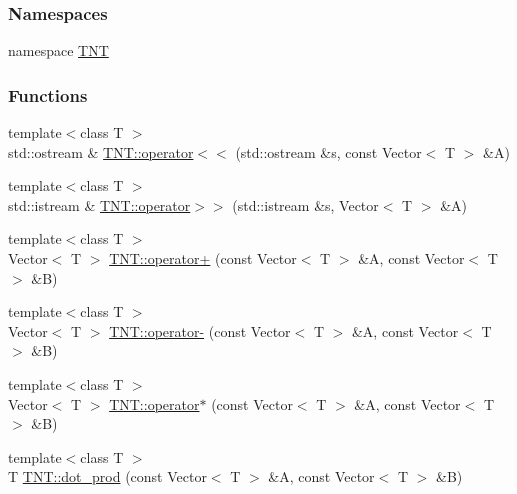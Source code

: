 \subsubsection*{Namespaces}
\begin{DoxyCompactItemize}
\item 
namespace \hyperlink{namespace_t_n_t}{TNT}
\end{DoxyCompactItemize}
\subsubsection*{Functions}
\begin{DoxyCompactItemize}
\item 
{\footnotesize template$<$class T $>$ }\\std::ostream \& \hyperlink{namespace_t_n_t_abde63a52052fdea9dee4e0b93de1ea31}{TNT::operator$<$$<$} (std::ostream \&s, const Vector$<$ T $>$ \&A)
\item 
{\footnotesize template$<$class T $>$ }\\std::istream \& \hyperlink{namespace_t_n_t_af6e388c7d420d577ed9cc637434ca9e8}{TNT::operator$>$$>$} (std::istream \&s, Vector$<$ T $>$ \&A)
\item 
{\footnotesize template$<$class T $>$ }\\Vector$<$ T $>$ \hyperlink{namespace_t_n_t_a43a2485a56e5fcee7889f38c6508e0c8}{TNT::operator+} (const Vector$<$ T $>$ \&A, const Vector$<$ T $>$ \&B)
\item 
{\footnotesize template$<$class T $>$ }\\Vector$<$ T $>$ \hyperlink{namespace_t_n_t_a8b095f7f115ba4696117dd2620788023}{TNT::operator-\/} (const Vector$<$ T $>$ \&A, const Vector$<$ T $>$ \&B)
\item 
{\footnotesize template$<$class T $>$ }\\Vector$<$ T $>$ \hyperlink{namespace_t_n_t_a82d5050bcaa4f22b3e38182e5615c823}{TNT::operator$\ast$} (const Vector$<$ T $>$ \&A, const Vector$<$ T $>$ \&B)
\item 
{\footnotesize template$<$class T $>$ }\\T \hyperlink{namespace_t_n_t_a29b9c49039fe3870d6cdedb3ec804c55}{TNT::dot\_\-prod} (const Vector$<$ T $>$ \&A, const Vector$<$ T $>$ \&B)
\end{DoxyCompactItemize}
